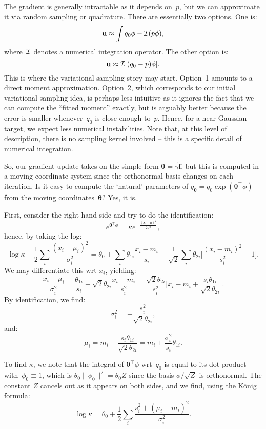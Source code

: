 \documentclass{article}
\def\x{\mathbf{x}}
\def\th{{\boldsymbol{\theta}}}
\def\u{\mathbf{u}}
\def\f{\mathbf{f}}
\begin{document}
The gradient is generally intractable as it depends on~$p$, but we can approximate it via random sampling or quadrature. There are essentially two options. One is:
$$
\u \approx \int q_0\phi - {\cal I}(p\phi),
$$
where~${\cal I}$ denotes a numerical integration operator. The other option is:
$$
\u \approx {\cal I}[(q_0- p)\phi].
$$
This is where the variational sampling story may start. Option~1 amounts to a direct moment approximation. Option~2, which corresponds to our initial variational sampling idea, is perhaps less intuitive as it ignores the fact that we can compute the ``fitted moment'' exactly, but is arguably better because the error is smaller whenever~$q_0$ is close enough to~$p$. Hence, for a near Gaussian target, we expect less numerical instabilities. Note that, at this level of description, there is no sampling kernel involved -- this is a specific detail of numerical integration.

So, our gradient update takes on the simple form $\th = \gamma\tilde{\f}$, but this is computed in a moving coordinate system since the orthonormal basis changes on each iteration. Is it easy to compute the `natural' parameters of $q_\th=q_0\exp(\th^\top \phi)$ from the moving coordinates~$\th$? Yes, it is.

First, consider the right hand side and try to do the identification:
$$
e^{\th^\top \phi} = \kappa e^{-\frac{(\x-\mu)^2}{2\sigma^2}},
$$
hence, by taking the log:
$$
\log\kappa - \frac{1}{2} \sum_i \frac{(x_i-\mu_i)^2}{\sigma_i^2}
= 
\theta_0 + \sum_i \theta_{1i}\frac{x_i-m_i}{s_i}
+ \frac{1}{\sqrt{2}} \sum_i \theta_{2i}\big[ \frac{(x_i-m_i)^2}{s_i^2} -1 \big]. 
$$
We may differentiate this wrt $x_i$, yielding: 
$$
\frac{x_i-\mu_i}{\sigma_i^2} 
= \frac{\theta_{1i}}{s_i} + \sqrt{2} \theta_{2i} \frac{x_i-m_i}{s_i^2}
= \frac{\sqrt{2} \theta_{2i}}{s_i^2} \big[x_i - m_i + \frac{s_i\theta_{1i}}{\sqrt{2} \theta_{2i}} \big].
$$
By identification, we find:
$$
\sigma_i^2 = - \frac{s_i^2}{\sqrt{2}\theta_{2i}},
$$
and:
$$
\mu_i = m_i - \frac{s_i\theta_{1i}}{\sqrt{2}\theta_{2i}} = m_i + \frac{\sigma_i^2}{s_i}\theta_{1i}.
$$

To find $\kappa$, we note that the integral of $\th^\top \phi$ wrt~$q_0$ is equal to its dot product with~$\phi_0\equiv 1$, which is $\theta_0 \|\phi_0\|^2=\theta_0 Z$ since the basis $\phi/\sqrt{Z}$ is orthonormal. The constant $Z$ cancels out as it appears on both sides, and we find, using the K\"onig formula:
$$
\log \kappa = \theta_0 + \frac{1}{2}\sum_i \frac{s_i^2 + (\mu_i-m_i)^2}{\sigma_i^2}.
$$
\end{document}
